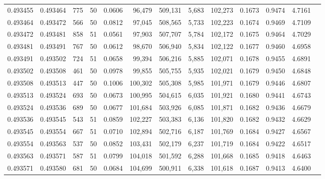 \begin{tabular}{rrrrrrrrrrrrr}
0.493455 & 0.493464 &   775 &  50 &                                     0.0606 &  96,479 & 509,131 &   5,683 & 102,273 & 0.1673 & 0.9474 & 4.7161 \\
0.493464 & 0.493472 &   566 &  50 &                                     0.0812 &  97,045 & 508,565 &   5,733 & 102,223 & 0.1674 & 0.9469 & 4.7109 \\
0.493472 & 0.493481 &   858 &  51 &                                     0.0561 &  97,903 & 507,707 &   5,784 & 102,172 & 0.1675 & 0.9464 & 4.7029 \\
0.493481 & 0.493491 &   767 &  50 &                                     0.0612 &  98,670 & 506,940 &   5,834 & 102,122 & 0.1677 & 0.9460 & 4.6958 \\
0.493491 & 0.493502 &   724 &  51 &                                     0.0658 &  99,394 & 506,216 &   5,885 & 102,071 & 0.1678 & 0.9455 & 4.6891 \\
0.493502 & 0.493508 &   461 &  50 &                                     0.0978 &  99,855 & 505,755 &   5,935 & 102,021 & 0.1679 & 0.9450 & 4.6848 \\
0.493508 & 0.493513 &   447 &  50 &                                     0.1006 & 100,302 & 505,308 &   5,985 & 101,971 & 0.1679 & 0.9446 & 4.6807 \\
0.493513 & 0.493524 &   693 &  50 &                                     0.0673 & 100,995 & 504,615 &   6,035 & 101,921 & 0.1680 & 0.9441 & 4.6743 \\
0.493524 & 0.493536 &   689 &  50 &                                     0.0677 & 101,684 & 503,926 &   6,085 & 101,871 & 0.1682 & 0.9436 & 4.6679 \\
0.493536 & 0.493545 &   543 &  51 &                                     0.0859 & 102,227 & 503,383 &   6,136 & 101,820 & 0.1682 & 0.9432 & 4.6629 \\
0.493545 & 0.493554 &   667 &  51 &                                     0.0710 & 102,894 & 502,716 &   6,187 & 101,769 & 0.1684 & 0.9427 & 4.6567 \\
0.493554 & 0.493563 &   537 &  50 &                                     0.0852 & 103,431 & 502,179 &   6,237 & 101,719 & 0.1684 & 0.9422 & 4.6517 \\
0.493563 & 0.493571 &   587 &  51 &                                     0.0799 & 104,018 & 501,592 &   6,288 & 101,668 & 0.1685 & 0.9418 & 4.6463 \\
0.493571 & 0.493580 &   681 &  50 &                                     0.0684 & 104,699 & 500,911 &   6,338 & 101,618 & 0.1687 & 0.9413 & 4.6400 \\

\end{tabular}
